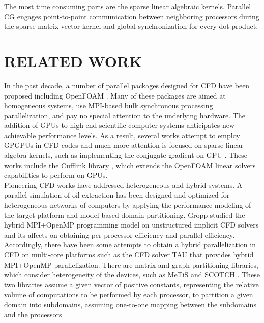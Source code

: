 \documentclass[3p,times]{elsarticle}
\begin{document}
The most time consuming parts are the sparse linear algebraic kernels. Parallel CG engages point-to-point communication between neighboring processors during the sparse matrix vector kernel and global synchronization for every dot product. 

\section{RELATED WORK}
In the past decade, a number of parallel packages designed for CFD have been proposed including OpenFOAM \cite{openfoam}. Many of these packages are aimed at homogeneous systems, use MPI-based bulk synchronous processing parallelization, and pay no special attention to the underlying hardware. The addition of GPUs to high-end scientific computer systems anticipates new achievable performance levels. As a result, several works attempt to employ GPGPUs in CFD codes and much more attention is focused on sparse linear algebra kernels, such as implementing the conjugate gradient on GPU \cite{ament2010parallel}. These works include the Cufflink library \cite{Cufflink}, which extends the OpenFOAM linear solvers capabilities to perform on GPUs. \\

Pioneering CFD works have addressed heterogeneous and hybrid systems. A parallel simulation of oil extraction has been designed and optimized for heterogeneous networks of computers \cite{alexey98} by applying the performance modeling of the target platform and model-based domain partitioning. Gropp \cite{gropp2001high} studied the hybrid MPI+OpenMP programming model on unstructured implicit CFD solvers and its affects on obtaining per-processor efficiency and parallel efficiency. Accordingly, there have been some attempts to obtain a hybrid parallelization in CFD on multi-core platforms \cite{dagnaaevaluation} such as the CFD solver TAU \cite{tauSolver} that provides hybrid MPI+OpenMP parallelization. There are matrix and graph partitioning libraries, which consider heterogeneity of the devices, such as MeTiS \cite{MeTiS} and SCOTCH \cite{scotch}. These two libraries assume a given vector of positive constants, representing the relative volume of computations to be performed by each processor, to partition a given domain into subdomains, assuming one-to-one mapping between the subdomains and the processors. 
~\\
\end{document}
